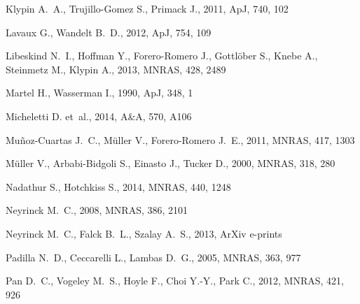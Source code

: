 \documentclass[a4,useAMS,usenatbib,usegraphicx]{mn2e}
\newcommand{\apj}{ApJ}
\newcommand{\mnras}{MNRAS}
\newcommand{\aap}{A\&A}
\begin{document}
\begin{thebibliography}{}
{Klypin} A.~A.,  {Trujillo-Gomez} S.,    {Primack} J.,  2011, \apj, 740, 102

{Lavaux} G.,  {Wandelt} B.~D.,  2012, \apj, 754, 109

{Libeskind} N.~I.,  {Hoffman} Y.,  {Forero-Romero} J.,  {Gottl{\"o}ber} S.,
  {Knebe} A.,  {Steinmetz} M.,    {Klypin} A.,  2013, \mnras, 428, 2489

{Martel} H.,  {Wasserman} I.,  1990, \apj, 348, 1

{Micheletti} D.  et~al., 2014, \aap, 570, A106

{Mu{\~n}oz-Cuartas} J.~C.,  {M{\"u}ller} V.,    {Forero-Romero} J.~E.,  2011,
  \mnras, 417, 1303

{M{\"u}ller} V.,  {Arbabi-Bidgoli} S.,  {Einasto} J.,    {Tucker} D.,  2000,
  \mnras, 318, 280

{Nadathur} S.,  {Hotchkiss} S.,  2014, \mnras, 440, 1248

{Neyrinck} M.~C.,  2008, \mnras, 386, 2101

{Neyrinck} M.~C.,  {Falck} B.~L.,    {Szalay} A.~S.,  2013, ArXiv e-prints

{Padilla} N.~D.,  {Ceccarelli} L.,    {Lambas} D.~G.,  2005, \mnras, 363, 977

{Pan} D.~C.,  {Vogeley} M.~S.,  {Hoyle} F.,  {Choi} Y.-Y.,    {Park} C.,  2012,
  \mnras, 421, 926


\end{thebibliography}
\end{document}
